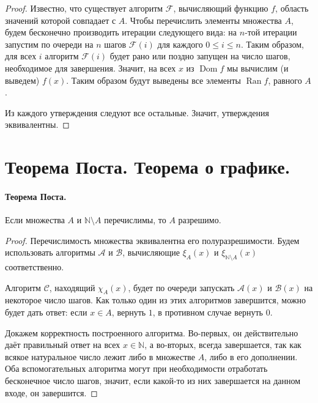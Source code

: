 \documentclass{article}
\begin{document}
\begin{proof}
        Известно, что существует алгоритм $\mathcal{F}$, вычисляющий функцию $f$, область значений
        которой совпадает с $A$. Чтобы перечислить элементы множества $A$, будем бесконечно
        производить итерации следующего вида: на $n$-той итерации запустим по очереди на $n$
        шагов $\mathcal{F}(i)$ для каждого $0 \leqslant i \leqslant n$. Таким образом, для всех $i$
        алгоритм $\mathcal{F}(i)$ будет рано или поздно запущен на число шагов, необходимое для
        завершения.  Значит, на всех $x$ из $\operatorname{Dom} f$ мы вычислим (и выведем) $f(x)$.
        Таким образом будут выведены все элементы $\operatorname{Ran} f$, равного $A$.

        Из каждого утверждения следуют все остальные. Значит, утверждения эквивалентны.
    \end{proof}

    \section{Теорема Поста. Теорема о графике.}

    \paragraph{Теорема Поста.} Если множества $A$ и $\mathbb{N} \setminus A$ перечислимы, то $A$
    разрешимо.

    \begin{proof}
        Перечислимость множества эквивалентна его полуразрешимости. Будем использовать алгоритмы
        $\mathcal{A}$ и $\mathcal{B}$, вычисляющие $\xi_{A}(x)$ и $\xi_{\mathbb{N} \setminus A}(x)$
        соответственно.

        Алгоритм $\mathcal{C}$, находящий $\chi_A(x)$, будет по очереди запускать $\mathcal{A}(x)$ и
        $\mathcal{B}(x)$ на некоторое число шагов. Как только один из этих алгоритмов завершится, можно
        будет дать ответ: если $x \in A$, вернуть $1$, в противном случае вернуть $0$.

        Докажем корректность построенного алгоритма. Во-первых, он действительно даёт правильный
        ответ на всех $x \in \mathbb{N}$, а во-вторых, всегда завершается, так как всякое
        натуральное число лежит либо в множестве $A$, либо в его дополнении. Оба вспомогательных
        алгоритма могут при необходимости отработать бесконечное число шагов, значит, если какой-то
        из них завершается на данном входе, он завершится.
    \end{proof}
\end{document}
